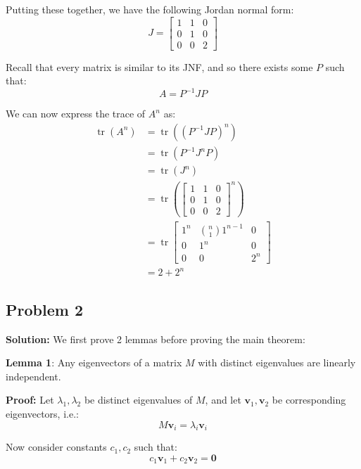 \documentclass{article}
\renewcommand\vec{\mathbf}
\begin{document}
Putting these together, we have the following Jordan normal form:
$$J=\begin{bmatrix}
  1&1&0\\0&1&0\\0&0&2
\end{bmatrix}$$

Recall that every matrix is similar to its JNF, and so there exists some $P$ such that:
$$A=P^{-1}JP$$

We can now express the trace of $A^n$ as:
\begin{align*}
  \operatorname{tr}(A^n)&=\operatorname{tr}((P^{-1}JP)^n)\tag{similar to JNF}\\
  &=\operatorname{tr}(P^{-1}J^nP)\tag{power of similar matrices are similar}\\
  &=\operatorname{tr}(J^n)\tag{trace is constant for similar matrices}\\
  &=\operatorname{tr}\left(\begin{bmatrix}
    1&1&0\\0&1&0\\0&0&2
  \end{bmatrix}^n\right)\\
  &=\operatorname{tr}\begin{bmatrix}
    1^n&\binom{n}{1}1^{n-1}&0\\0&1^n&0\\0&0&2^n
  \end{bmatrix}\tag{power of JNF}\\
  &=2+2^n
\end{align*}
\newpage

\subsection*{Problem 2}
\noindent\textbf{Solution:} We first prove 2 lemmas before proving the main theorem:
\medskip

\textbf{Lemma 1}: Any eigenvectors of a matrix $M$ with distinct eigenvalues are linearly independent.
\medskip

\textbf{Proof:} Let $\lambda_1,\lambda_2$ be distinct eigenvalues of $M$, and let $\vec v_1,\vec v_2$ be corresponding eigenvectors, i.e.:
\begin{equation}
  M\vec v_i=\lambda_i\vec v_i\tag{Eq. 1}
\end{equation}

Now consider constants $c_1,c_2$ such that:
\begin{equation}
  c_1\vec v_1+c_2\vec v_2=\vec 0\tag{Eq. 2}
\end{equation}
\end{document}

